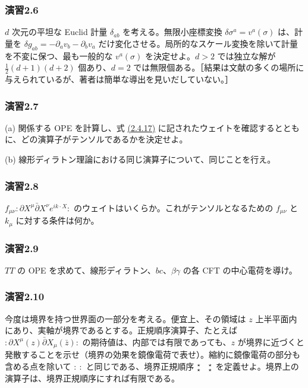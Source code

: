\medskip
\subsubsection*{演習2.6}\label{ex:2.6}
$d$ 次元の平坦な Euclid 計量 $\delta_{ab}$ を考える。無限小座標変換 $\delta\sigma^a=v^a(\sigma)$ は、計量を $\delta g_{ab}=-\partial_av_b-\partial_bv_a$ だけ変化させる。局所的なスケール変換を除いて計量を不変に保つ、最も一般的な $v^a(\sigma)$ を決定せよ。$d>2$ では独立な解が $\frac12(d+1)(d+2)$ 個あり、$d=2$ では無限個ある。［結果は文献の多くの場所に与えられているが、著者は簡単な導出を見いだしていない。］

\medskip
\subsubsection*{演習2.7}\label{ex:2.7}
(a) 関係する OPE を計算し、式 \hyperref[eq:2.4.17]{(2.4.17)} に記されたウェイトを確認するとともに、どの演算子がテンソルであるかを決定せよ。

\noindent
(b) 線形ディラトン理論における同じ演算子について、同じことを行え。

\medskip
\subsubsection*{演習2.8}\label{ex:2.8}
$f_{\mu\nu}:\partial X^\mu\bar\partial X^\nu e^{ik\cdot X}:$ のウェイトはいくらか。これがテンソルとなるための $f_{\mu\nu}$ と $k_\mu$ に対する条件は何か。

\medskip
\subsubsection*{演習2.9}\label{ex:2.9}
$TT$ の OPE を求めて、線形ディラトン、$bc$、$\beta\gamma$ の各 CFT の中心電荷を導け。

\medskip
\subsubsection*{演習2.10}\label{ex:2.10}
今度は境界を持つ世界面の一部分を考える。便宜上、その領域は $z$ 上半平面内にあり、実軸が境界であるとする。正規順序演算子、たとえば $:\partial X^\mu(z)\bar\partial X_\mu(\bar z):$ の期待値は、内部では有限であっても、$z$ が境界に近づくと発散することを示せ（境界の効果を鏡像電荷で表せ）。縮約に鏡像電荷の部分も含める点を除いて $:\ :$ と同じである、境界正規順序 $\bndnorm{\phantom X}$ を定義せよ。境界上の演算子は、境界正規順序にすれば有限である。

